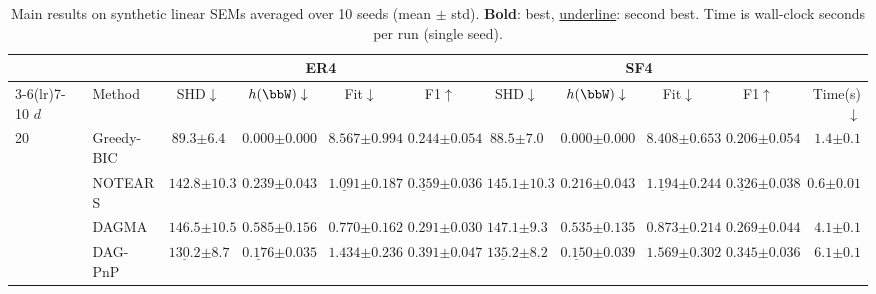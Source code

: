 \documentclass[conference]{IEEEtran}
\begin{document}
\begin{table}[t]
  \centering
  \caption{
    Main results on synthetic linear SEMs averaged over 10 seeds
    (mean $\pm$ std). \textbf{Bold}: best, \underline{underline}: second best.
    Time is wall-clock seconds per run (single seed).}
  \label{tab:main}
  \scriptsize
  \setlength{\tabcolsep}{2pt}
  \renewcommand{\arraystretch}{0.9}
  \begin{tabular}{llccccccccr}
    \toprule
    & & \multicolumn{4}{c}{ER4} & \multicolumn{4}{c}{SF4} & \\
    \cmidrule(lr){3-6}\cmidrule(lr){7-10}
    $d$ & Method
      & SHD$\downarrow$ & $h(\bbW)\downarrow$ & Fit$\downarrow$ & F1$\uparrow$
      & SHD$\downarrow$ & $h(\bbW)\downarrow$ & Fit$\downarrow$ & F1$\uparrow$
      & Time(s)$\downarrow$ \\
    \midrule
    \multirow{4}{*}{20}
    & Greedy-BIC & $\mathbf{89.3}{\scriptscriptstyle \pm6.4}$ & $\mathbf{0.000}{\scriptscriptstyle \pm0.000}$ & $8.567{\scriptscriptstyle \pm0.994}$ & $0.244{\scriptscriptstyle \pm0.054}$
                 & $\mathbf{88.5}{\scriptscriptstyle \pm7.0}$ & $\mathbf{0.000}{\scriptscriptstyle \pm0.000}$ & $8.408{\scriptscriptstyle \pm0.653}$ & $0.206{\scriptscriptstyle \pm0.054}$ & $1.4{\scriptscriptstyle \pm0.1}$  \\
      & NOTEARS  & $142.8{\scriptscriptstyle \pm10.3}$ & $0.239{\scriptscriptstyle \pm0.043}$ & $\underline{1.091}{\scriptscriptstyle \pm0.187}$ & $\underline{0.359}{\scriptscriptstyle \pm0.036}$
                 & $145.1{\scriptscriptstyle \pm10.3}$ & $0.216{\scriptscriptstyle \pm0.043}$ & $\underline{1.194}{\scriptscriptstyle \pm0.244}$ & $\underline{0.326}{\scriptscriptstyle \pm0.038}$ & $0.6{\scriptscriptstyle \pm0.01}$  \\
      & DAGMA    & $146.5{\scriptscriptstyle \pm10.5}$ & $0.585{\scriptscriptstyle \pm0.156}$ & $\mathbf{0.770}{\scriptscriptstyle \pm0.162}$ & $0.291{\scriptscriptstyle \pm0.030}$
                 & $147.1{\scriptscriptstyle \pm9.3}$ & $0.535{\scriptscriptstyle \pm0.135}$ & $\mathbf{0.873}{\scriptscriptstyle \pm0.214}$ & $0.269{\scriptscriptstyle \pm0.044}$ & $4.1{\scriptscriptstyle \pm0.1}$  \\
      & DAG-PnP  & $\underline{130.2}{\scriptscriptstyle \pm8.7}$ & $\underline{0.176}{\scriptscriptstyle \pm0.035}$ & $1.434{\scriptscriptstyle \pm0.236}$ & $\mathbf{0.391}{\scriptscriptstyle \pm0.047}$
                 & $\underline{135.2}{\scriptscriptstyle \pm8.2}$ & $\underline{0.150}{\scriptscriptstyle \pm0.039}$ & $1.569{\scriptscriptstyle \pm0.302}$ & $\mathbf{0.345}{\scriptscriptstyle \pm0.036}$ & $6.1{\scriptscriptstyle \pm0.1}$ \\

\end{tabular}
\end{table}
\end{document}
